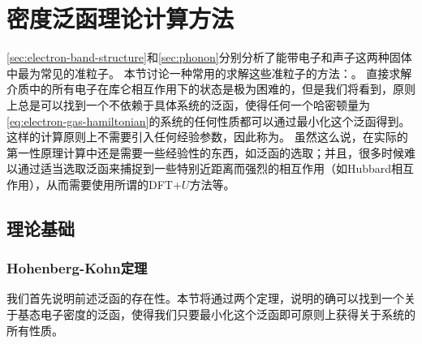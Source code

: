 \chapter{密度泛函理论计算方法}

\autoref{sec:electron-band-structure}和\autoref{sec:phonon}分别分析了能带电子和声子这两种固体中最为常见的准粒子。
本节讨论一种常用的求解这些准粒子的方法：。
直接求解介质中的所有电子在库仑相互作用下的状态是极为困难的，但是我们将看到，原则上总是可以找到一个不依赖于具体系统的泛函，使得任何一个哈密顿量为\eqref{eq:electron-gas-hamiltonian}的系统的任何性质都可以通过最小化这个泛函得到。
这样的计算原则上不需要引入任何经验参数，因此称为。
虽然这么说，在实际的第一性原理计算中还是需要一些经验性的东西，如泛函的选取；并且，很多时候难以通过适当选取泛函来捕捉到一些特别近距离而强烈的相互作用（如Hubbard相互作用），从而需要使用所谓的DFT+$U$方法等。

\section{理论基础}

\subsection{Hohenberg-Kohn定理}

我们首先说明前述泛函的存在性。本节将通过两个定理，说明的确可以找到一个关于基态电子密度的泛函，使得我们只要最小化这个泛函即可原则上获得关于系统的所有性质。

